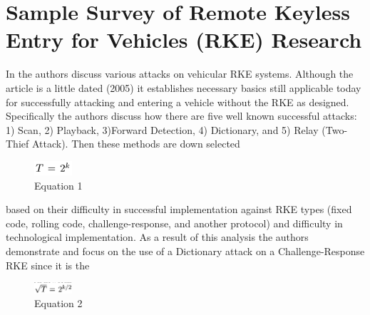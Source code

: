 \documentclass[conference]{journal}
\begin{document}
\section{Sample Survey of Remote Keyless Entry for Vehicles (RKE) Research}
In \cite{1386610} the authors discuss various attacks on vehicular RKE systems. Although the article is a little dated (2005) it establishes necessary basics still applicable today for successfully attacking and entering a vehicle without the RKE as designed. Specifically the authors discuss how there are five well known successful attacks: 1) Scan, 2) Playback, 3)Forward Detection, 4) Dictionary, and 5) Relay (Two-Thief Attack). Then these methods are down selected
\begin{figure}
\centering
\includegraphics[width=0.125\textwidth]{Equation1.png}
\caption{\label{fig:Equation1} Equation 1}
\end{figure}
 based on their difficulty in successful implementation against RKE types (fixed code, rolling code, challenge-response, and another protocol) and difficulty in technological implementation.  As a result of this analysis the authors demonstrate and focus on the use of a Dictionary attack on a Challenge-Response RKE since it is the 
\begin{figure}
\centering
\includegraphics[width=0.125\textwidth]{Equation2.png}
\caption{\label{fig:Equation2} Equation 2}
\end{figure}
\end{document}
